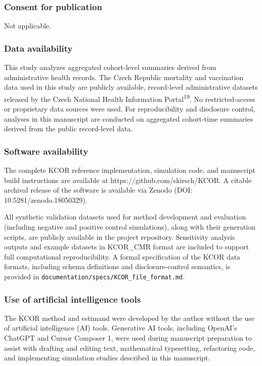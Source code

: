 \documentclass[
]{article}
\begin{document}
\subsubsection{Consent for publication}\label{consent-for-publication}

Not applicable.

\subsubsection{Data availability}\label{data-availability}

This study analyzes aggregated cohort-level summaries derived from administrative health records. The Czech Republic mortality and vaccination data used in this study are publicly available, record-level administrative datasets released by the Czech National Health Information Portal\textsuperscript{19}. No restricted-access or proprietary data sources were used. For reproducibility and disclosure control, analyses in this manuscript are conducted on aggregated cohort-time summaries derived from the public record-level data.

\subsubsection{Software availability}\label{software-availability}

The complete KCOR reference implementation, simulation code, and manuscript build instructions are available at https://github.com/skirsch/KCOR. A citable archival release of the software is available via Zenodo (DOI: 10.5281/zenodo.18050329).

All synthetic validation datasets used for method development and evaluation (including negative and positive control simulations), along with their generation scripts, are publicly available in the project repository. Sensitivity analysis outputs and example datasets in KCOR\_CMR format are included to support full computational reproducibility. A formal specification of the KCOR data formats, including schema definitions and disclosure-control semantics, is provided in \texttt{documentation/specs/KCOR\_file\_format.md}.

\subsubsection{Use of artificial intelligence tools}\label{use-of-artificial-intelligence-tools}

The KCOR method and estimand were developed by the author without the use of artificial intelligence (AI) tools. Generative AI tools, including OpenAI's ChatGPT and Cursor Composer 1, were used during manuscript preparation to assist with drafting and editing text, mathematical typesetting, refactoring code, and implementing simulation studies described in this manuscript.
\end{document}
